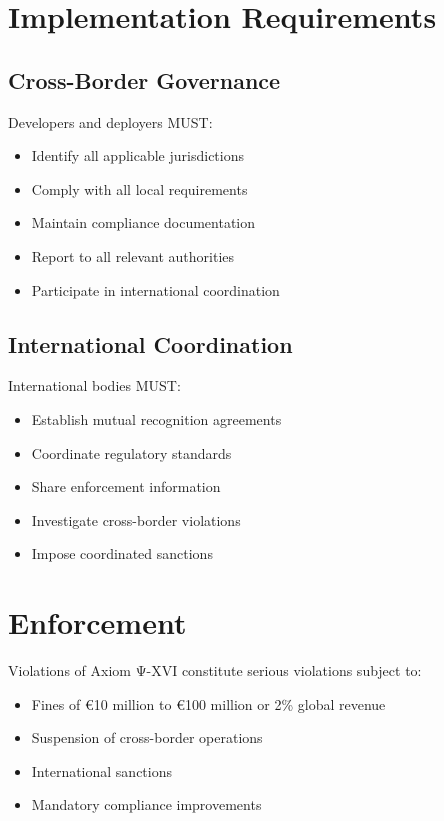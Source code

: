 \vspace{0.5cm}

\section{Implementation Requirements}

\subsection{Cross-Border Governance}

Developers and deployers MUST:

\begin{itemize}
    \item Identify all applicable jurisdictions
    \item Comply with all local requirements
    \item Maintain compliance documentation
    \item Report to all relevant authorities
    \item Participate in international coordination
\end{itemize}

\subsection{International Coordination}

International bodies MUST:

\begin{itemize}
    \item Establish mutual recognition agreements
    \item Coordinate regulatory standards
    \item Share enforcement information
    \item Investigate cross-border violations
    \item Impose coordinated sanctions
\end{itemize}

\vspace{0.5cm}

\section{Enforcement}

Violations of Axiom Ψ-XVI constitute serious violations subject to:

\begin{itemize}
    \item Fines of €10 million to €100 million or 2\% global revenue
    \item Suspension of cross-border operations
    \item International sanctions
    \item Mandatory compliance improvements
\end{itemize}

